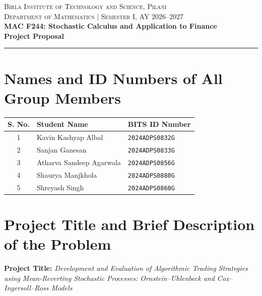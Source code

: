 \documentclass[11pt,a4paper]{article}
\begin{document}
\begin{center}
    {\scshape\Large Birla Institute of Technology and Science, Pilani}\\[0.3em]
    {\scshape\normalsize Department of Mathematics $\mid$ Semester I, AY 2026--2027}\\[0.5em]
    {\LARGE\bfseries MAC F244: Stochastic Calculus and Application to Finance}\\[0.4em]
    {\large\bfseries Project Proposal}\\[0.4em]
    \rule{\textwidth}{0.8pt}
\end{center}
\vspace{0.5em}

\section{Names and ID Numbers of All Group Members}

\begin{table}[h!]
\centering
\small
\renewcommand{\arraystretch}{1.3}
\begin{tabular}{@{} c l l @{}}
\toprule
\textbf{S. No.} & \textbf{Student Name} & \textbf{BITS ID Number} \\
\midrule
1 & Kavin Kashyap Albal & \texttt{2024ADPS0832G} \\
2 & Sanjan Ganesan & \texttt{2024ADPS0833G} \\
3 & Atharva Sandeep Agarwala & \texttt{2024ADPS0856G} \\
4 & Shaurya Manjkhola & \texttt{2024ADPS0880G} \\
5 & Shreyash Singh & \texttt{2024ADPS0860G} \\
\bottomrule
\end{tabular}
\end{table}

\section{Project Title and Brief Description of the Problem}

\noindent\textbf{Project Title:} \textit{Development and Evaluation of Algorithmic Trading Strategies using Mean-Reverting Stochastic Processes: Ornstein--Uhlenbeck and Cox--Ingersoll--Ross Models}
\end{document}

